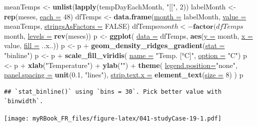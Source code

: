 \documentclass[twoside,symmetric]{book}
\newenvironment{Shaded}{}{}
\newcommand{\DataTypeTok}[1]{\underline{#1}}
\newcommand{\DecValTok}[1]{#1}
\newcommand{\FloatTok}[1]{#1}
\newcommand{\KeywordTok}[1]{\textbf{#1}}
\newcommand{\NormalTok}[1]{#1}
\newcommand{\OperatorTok}[1]{#1}
\newcommand{\OtherTok}[1]{#1}
\newcommand{\StringTok}[1]{#1}
\begin{document}
\begin{Shaded}
\begin{Highlighting}[]
\NormalTok{meanTemps <-}\StringTok{ }\KeywordTok{unlist}\NormalTok{(}\KeywordTok{lapply}\NormalTok{(tempDayEachMonth, }\StringTok{"[["}\NormalTok{, }\DecValTok{2}\NormalTok{))}
\NormalTok{labelMonth <-}\StringTok{ }\KeywordTok{rep}\NormalTok{(meses, }\DataTypeTok{each =} \DecValTok{48}\NormalTok{)}
\NormalTok{dfTemps <-}\StringTok{ }\KeywordTok{data.frame}\NormalTok{(}\DataTypeTok{month =}\NormalTok{ labelMonth, }\DataTypeTok{value =}\NormalTok{ meanTemps, }
  \DataTypeTok{stringsAsFactors =} \OtherTok{FALSE}\NormalTok{)}
\NormalTok{dfTemps}\OperatorTok{$}\NormalTok{month <-}\StringTok{ }\KeywordTok{factor}\NormalTok{(dfTemps}\OperatorTok{$}\NormalTok{month, }\DataTypeTok{levels =} \KeywordTok{rev}\NormalTok{(meses))}
\NormalTok{p <-}\StringTok{ }\KeywordTok{ggplot}\NormalTok{(}
  \DataTypeTok{data =}\NormalTok{ dfTemps, }
  \KeywordTok{aes}\NormalTok{(}\DataTypeTok{y =}\NormalTok{ month, }\DataTypeTok{x =}\NormalTok{ value,  }\DataTypeTok{fill =}\NormalTok{ ..x..))}
\NormalTok{p <-}\StringTok{ }\NormalTok{p }\OperatorTok{+}\StringTok{ }\KeywordTok{geom_density_ridges_gradient}\NormalTok{(}\DataTypeTok{stat =} \StringTok{"binline"}\NormalTok{)}
\NormalTok{p <-}\StringTok{ }\NormalTok{p }\OperatorTok{+}\StringTok{ }\KeywordTok{scale_fill_viridis}\NormalTok{(}
  \DataTypeTok{name =} \StringTok{"Temp. [°C]"}\NormalTok{, }\DataTypeTok{option =} \StringTok{"C"}\NormalTok{)}
\NormalTok{p <-}\StringTok{ }\NormalTok{p }\OperatorTok{+}\StringTok{ }\KeywordTok{xlab}\NormalTok{(}\StringTok{"Temperature"}\NormalTok{) }\OperatorTok{+}\StringTok{ }\KeywordTok{ylab}\NormalTok{(}\StringTok{""}\NormalTok{) }\OperatorTok{+}
\StringTok{    }\KeywordTok{theme}\NormalTok{(}
      \DataTypeTok{legend.position=}\StringTok{"none"}\NormalTok{,}
      \DataTypeTok{panel.spacing =} \KeywordTok{unit}\NormalTok{(}\FloatTok{0.1}\NormalTok{, }\StringTok{"lines"}\NormalTok{),}
      \DataTypeTok{strip.text.x =} \KeywordTok{element_text}\NormalTok{(}\DataTypeTok{size =} \DecValTok{8}\NormalTok{)}
\NormalTok{    ) }
\NormalTok{p}
\end{Highlighting}
\end{Shaded}

\begin{verbatim}
## `stat_binline()` using `bins = 30`. Pick better value with `binwidth`.
\end{verbatim}

\texttt{[image: myRBook\_FR\_files/figure-latex/041-studyCase-19-1.pdf]}
\end{document}
